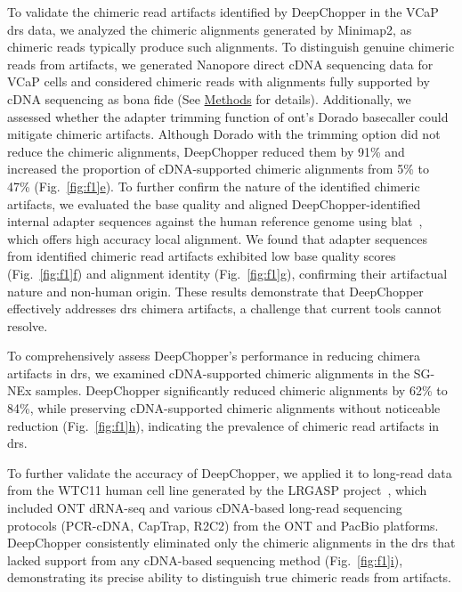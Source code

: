 \documentclass[pdflatex,sn-nature, lineno]{sn-jnl}%
\newcommand{\figref}[2]{Fig.~\hyperref[#1]{\ref*{#1}#2}}
\theoremstyle{thmstyleone}%
\theoremstyle{thmstyletwo}%
\theoremstyle{thmstylethree}%
\begin{document}
To validate the chimeric read artifacts identified by DeepChopper in the VCaP \gls{drs} data, we analyzed the chimeric alignments generated by Minimap2\cite{li2018minimap2}, as chimeric reads typically produce such alignments.
To distinguish genuine chimeric reads from artifacts, we generated Nanopore direct cDNA sequencing data for VCaP cells and considered chimeric reads with alignments fully supported by cDNA sequencing as bona fide (See \hyperref[sec:methods]{Methods} for details).
Additionally, we assessed whether the adapter trimming function of \gls{ont}'s Dorado basecaller could mitigate chimeric artifacts.
Although Dorado with the trimming option did not reduce the chimeric alignments, DeepChopper reduced them by 91\% and increased the proportion of cDNA-supported chimeric alignments from 5\% to 47\% (\figref{fig:f1}{e}).
To further confirm the nature of the identified chimeric artifacts, we evaluated the base quality and aligned DeepChopper-identified internal adapter sequences against the human reference genome using \gls{blat}~\cite{kent2002blat}, which offers high accuracy local alignment.
We found that adapter sequences from identified chimeric read artifacts exhibited low base quality scores (\figref{fig:f1}{f}) and alignment identity (\figref{fig:f1}{g}), confirming their artifactual nature and non-human origin.
These results demonstrate that DeepChopper effectively addresses \gls{drs} chimera artifacts, a challenge that current tools cannot resolve.

To comprehensively assess DeepChopper’s performance in reducing chimera artifacts in \gls{drs}, we examined cDNA-supported chimeric alignments in the SG-NEx samples. 
DeepChopper significantly reduced chimeric alignments by 62\% to 84\%, while preserving cDNA-supported chimeric alignments without noticeable reduction (\figref{fig:f1}{h}), indicating the prevalence of chimeric read artifacts in \gls{drs}. 

To further validate the accuracy of DeepChopper, we applied it to long-read data from the WTC11 human cell line generated by the LRGASP project~\cite{pardo2024systematic}, which included ONT dRNA-seq and various cDNA-based long-read sequencing protocols (PCR-cDNA, CapTrap, R2C2) from the ONT and PacBio platforms. DeepChopper consistently eliminated only the chimeric alignments in the \gls{drs} that lacked support from any cDNA-based sequencing method (\figref{fig:f1}{i}), demonstrating its precise ability to distinguish true chimeric reads from artifacts.
\end{document}
